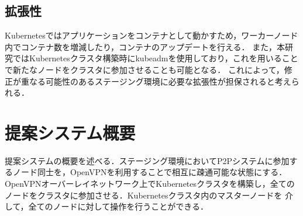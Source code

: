 \subsection{拡張性}
Kubernetesではアプリケーションをコンテナとして動かすため，ワーカーノード内でコンテナ数を増減したり，コンテナのアップデートを行える．
また，本研究ではKubernetesクラスタ構築時にkubeadmを使用しており，これを用いることで新たなノードをクラスタに参加させることも可能となる．
これによって，修正が重なる可能性のあるステージング環境に必要な拡張性が担保されると考えられる．

\section{提案システム概要}
\label{issue:about-system}
提案システムの概要を述べる．ステージング環境においてP2Pシステムに参加するノード同士を，OpenVPNを利用することで相互に疎通可能な状態にする．
OpenVPNオーバーレイネットワーク上でKubernetesクラスタを構築し，全てのノードをクラスタに参加させる．Kubernetesクラスタ内のマスターノードを
介して，全てのノードに対して操作を行うことができる．

